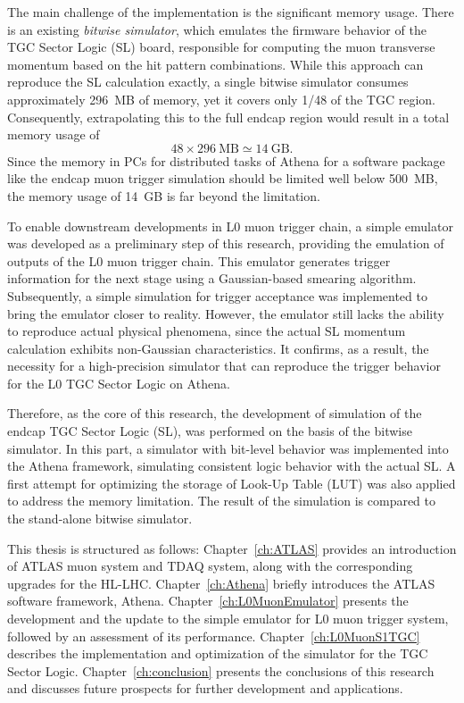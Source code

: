 The main challenge of the implementation is the significant memory usage. There is an existing \textit{bitwise simulator}, which emulates the firmware behavior of the TGC Sector Logic (SL) board, responsible for computing the muon transverse momentum based on the hit pattern combinations. While this approach can reproduce the SL calculation exactly, a single bitwise simulator consumes approximately 296~MB of memory, yet it covers only 1/48 of the TGC region. Consequently, extrapolating this to the full endcap region would result in a total memory usage of
\[
48 \times 296~\text{MB} \simeq 14~\text{GB}.
\]
Since the memory in PCs for distributed tasks of Athena for a software package like the endcap muon trigger simulation should be limited well below 500~MB, the memory usage of 14~GB is far beyond the limitation.

To enable downstream developments in L0 muon trigger chain, a simple emulator was developed as a preliminary step of this research, providing the emulation of outputs of the L0 muon trigger chain. This emulator generates trigger information for the next stage using a Gaussian-based smearing algorithm. Subsequently, a simple simulation for trigger acceptance was implemented to bring the emulator closer to reality. However, the emulator still lacks the ability to reproduce actual physical phenomena, since the actual SL momentum calculation exhibits non-Gaussian characteristics. It confirms, as a result, the necessity for a high-precision simulator that can reproduce the trigger behavior for the L0 TGC Sector Logic on Athena.

Therefore, as the core of this research, the development of simulation of the endcap TGC Sector Logic (SL), was performed on the basis of the bitwise simulator. In this part, a simulator with bit-level behavior was implemented into the Athena framework, simulating consistent logic behavior with the actual SL. A first attempt for optimizing the storage of Look-Up Table (LUT) was also applied to address the memory limitation. The result of the simulation is compared to the stand-alone bitwise simulator.

This thesis is structured as follows: Chapter~\ref{ch:ATLAS} provides an introduction of ATLAS muon system and TDAQ system, along with the corresponding upgrades for the HL-LHC. Chapter~\ref{ch:Athena} briefly introduces the ATLAS software framework, Athena. Chapter~\ref{ch:L0MuonEmulator} presents the development and the update to the simple emulator for L0 muon trigger system, followed by an assessment of its performance. Chapter~\ref{ch:L0MuonS1TGC} describes the implementation and optimization of the simulator for the TGC Sector Logic. Chapter~\ref{ch:conclusion} presents the conclusions of this research and discusses future prospects for further development and applications.